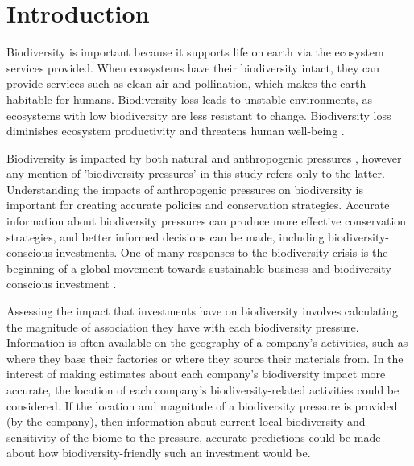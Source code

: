 \documentclass[11pt, a4paper, titlepage]{article}
\begin{document}
	\newpage
    \section*{Introduction}
    
   	 Biodiversity is important because it supports life on earth via the ecosystem services provided. When ecosystems have their biodiversity intact, they can provide services such as clean air and pollination, which makes the earth habitable for humans. Biodiversity loss leads to unstable environments, as ecosystems with low biodiversity are less resistant to change. Biodiversity loss diminishes ecosystem productivity \cite{duffy2017biodiversity} and threatens human well-being \cite{diaz2006biodiversity}. \newline
   	 
   	 Biodiversity is impacted by both natural and anthropogenic pressures \cite{nobel2020anthropogenic}, however any mention of 'biodiversity pressures' in this study refers only to the latter. Understanding the impacts of anthropogenic pressures on biodiversity is important for creating accurate policies and conservation strategies. Accurate information about biodiversity pressures can produce more effective conservation strategies, and better informed decisions can be made, including biodiversity-conscious investments. One of many responses to the biodiversity crisis \cite{ogar2020science} is the beginning of a global movement towards sustainable business and biodiversity-conscious investment \cite{pri2020}\cite{worldeconomicforum2020}\cite{wwf2020}. \newline
   	 
   	 Assessing the impact that investments have on biodiversity involves calculating the magnitude of association they have with each biodiversity pressure. Information is often available on the geography of a company's activities, such as where they base their factories or where they source their materials from. In the interest of making estimates about each company's biodiversity impact more accurate, the location of each company's biodiversity-related activities could be considered. If the location and magnitude of a biodiversity pressure is provided (by the company), then information about current local biodiversity and sensitivity of the biome to the pressure, accurate predictions could be made about how biodiversity-friendly such an investment would be.  \newline
   	 
\end{document}
